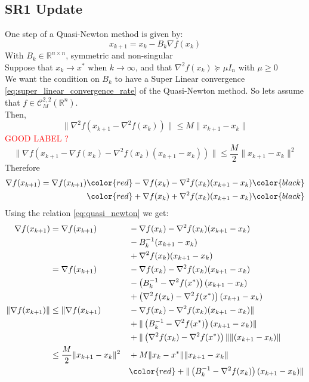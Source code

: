 \documentclass[12pt, openany]{report}
\newcommand{\R}{\mathbb{R}}
\newcommand{\C}{\mathcal{C}}
\theoremstyle{definition}
\begin{document}
\subsection{SR1 Update}
One step of a Quasi-Newton method is given by:
\begin{equation}\label{eq:quasi_newton}
	x_{k+1} = x_k -B_k \nabla f(x_k)
\end{equation}
With $B_k \in \R^{n\times n}$, symmetric and non-singular\\
Suppose that $x_k \to x^*$ when $k \to \infty$, and that $\nabla^2f(x_k) \succeq \mu I_n$ with $\mu \geq 0$\\
We want the condition on $B_k$ to have a Super Linear convergence \eqref{eq:super_linear_convergence_rate} of the Quasi-Newton method. So lets assume that $f \in \C_M^{2,2}(\R^n)$.\\
Then,
\begin{equation}\label{eq:bound_hessian_difference}
	\|\nabla^2f(x_{k+1}-\nabla^2f(x_k))\| \leq M \|x_{k+1}-x_k\|
\end{equation}
\textcolor{red}{GOOD LABEL ?}
\begin{equation}\label{eq:M_smoothness}
	\|\nabla f(x_{k+1}-\nabla f(x_k)-\nabla^2 f(x_k)(x_{k+1}-x_k))\| \leq \frac{M}{2} \|x_{k+1}-x_k\|^2
\end{equation}
Therefore
\begin{equation}
	\begin{aligned}
		\nabla f(x_{k+1}) = \nabla f(x_{k+1}) &  \color{red}  - \nabla f(x_k) - \nabla^2 f(x_k) (x_{k+1}-x_k)  \color{black} \\ &  \color{red} + \nabla f(x_k) + \nabla^2 f(x_k) (x_{k+1}-x_k) \color{black}
	\end{aligned}
\end{equation}
Using the relation \eqref{eq:quasi_newton} we get:
\begin{equation}
	\begin{aligned}
		\nabla f(x_{k+1}) &= \nabla f(x_{k+1}) &&- \nabla f(x_k)- \nabla^2 f(x_k) (x_{k+1}-x_k)\\ 
		& &&- B_k^{-1}  (x_{k+1}-x_k)\\ 
		& &&+ \nabla^2 f(x_k) (x_{k+1}-x_k)\\
		&= \nabla f(x_{k+1})  &&- \nabla f(x_k) - \nabla^2 f(x_k) (x_{k+1}-x_k)\\
		& &&- \left(B_k^{-1} - \nabla^2 f(x^*)\right) (x_{k+1}-x_k)\\
		& &&+ \left( \nabla^2 f(x_k) - \nabla^2 f(x^*)\right) (x_{k+1}-x_k)\\
		\|\nabla f(x_{k+1})\| &\leq \|\nabla f(x_{k+1})  &&- \nabla f(x_k) - \nabla^2 f(x_k) (x_{k+1}-x_k) \| \\
		& &&+ \|\left(B_k^{-1} - \nabla^2 f(x^*)\right) (x_{k+1}-x_k)\|\\
		& &&+ \|\left( \nabla^2 f(x_k) - \nabla^2 f(x^*)\right) \| \|(x_{k+1}-x_k)\|\\ 
		&\leq \frac{M}{2} \|x_{k+1}-x_k\|^2 &&+ M \|x_k-x^*\| \|x_{k+1}-x_k\|\\
		& &&\color{red}+ \|\left(B_k^{-1}-\nabla^2f(x_k)\right)(x_{k+1}-x_k)\|
	\end{aligned}
\end{equation}
\end{document}
